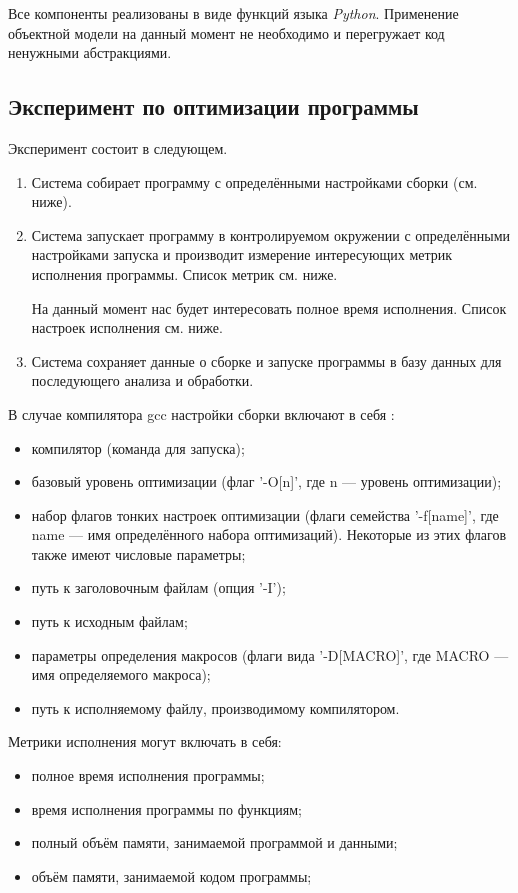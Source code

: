 Все компоненты реализованы в виде функций языка \textit{Python}. Применение объектной модели на данный момент не необходимо и перегружает код ненужными абстракциями.

\subsection{Эксперимент по оптимизации программы}
Эксперимент состоит в следующем.

\begin{enumerate}
	\item Система собирает программу с определёнными настройками сборки (см. ниже).

	\item Система запускает программу в контролируемом окружении с определёнными настройками запуска и производит измерение интересующих метрик исполнения программы. Список метрик см. ниже.

	На данный момент нас будет интересовать полное время исполнения.
	Список настроек исполнения см. ниже.

	\item Система сохраняет данные о сборке и запуске программы в базу данных для последующего анализа и обработки.
\end{enumerate}

В случае компилятора gcc настройки сборки включают в себя \cite{gcc-options}:
\begin{itemize}
    \item компилятор (команда для запуска);
    \item базовый уровень оптимизации (флаг '-O[n]', где n --- уровень оптимизации);
    \item набор флагов тонких настроек оптимизации (флаги семейства '-f[name]', где name --- имя определённого набора оптимизаций). Некоторые из этих флагов также имеют числовые параметры;
    \item путь к заголовочным файлам (опция '-I');
    \item путь к исходным файлам;
    \item параметры определения макросов (флаги вида '-D[MACRO]', где MACRO --- имя определяемого макроса);
    \item путь к исполняемому файлу, производимому компилятором.
\end{itemize}

Метрики исполнения могут включать в себя:
\begin{itemize}
    \item полное время исполнения программы;
    \item время исполнения программы по функциям;
    \item полный объём памяти, занимаемой программой и данными;
    \item объём памяти, занимаемой кодом программы;
\end{itemize}

